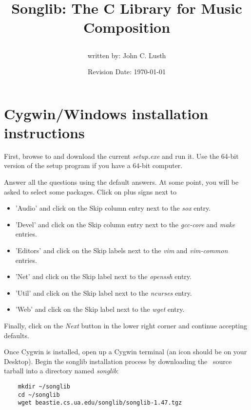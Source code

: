 \documentclass{article}
\title{Songlib: The C Library for Music Composition\\
\date{Revision Date: \today}}
\author{written by: John C. Lusth}
\begin{document}
\maketitle

\W\subsubsection*{}
\W\htmlrule

\section*{Cygwin/Windows installation instructions}

First, browse to
 and download the current
{\it setup.exe} and run it. Use the 64-bit version of the setup program if 
you have a 64-bit computer.

Answer all the questions using the default answers. At some point,
you will be asked to select some packages. Click on plus signs next
to

\begin{itemize}
\item
    'Audio' and click on the Skip column entry next to the {\it sox} entry.
\item
    'Devel' and click on the Skip column entry next to the {\it gcc-core}
    and {\it make} entries.
\item
    'Editors'
    and click on the Skip labels next to the {\it vim} and {\it vim-common}
    entries.
\item
    'Net'
    and click on the Skip label next to the {\it openssh} entry.
\item
    'Util'
    and click on the Skip label next to the {\it ncurses} entry.
\item
    'Web'
    and click on the Skip label next to the {\it wget} entry.
\end{itemize}

Finally, click on the {\it Next} button in the lower right corner
and continue accepting defaults.

Once Cygwin is installed, open up a Cygwin terminal (an icon should
be on your Desktop).
Begin the songlib installation process by downloading the \songlib\ source
tarball into a directory named {\it songlib}:

\begin{verbatim}
    mkdir ~/songlib
    cd ~/songlib
    wget beastie.cs.ua.edu/songlib/songlib-1.47.tgz
\end{verbatim}
\end{document}
